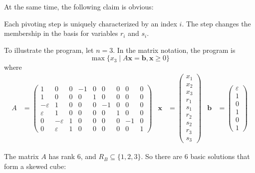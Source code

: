 \noindent
At the same time, the following claim is obvious:
\begin{clm}
  \label{clm:simplex:exp:1}
  Each pivoting step is uniquely characterized by an index $i$. The step changes the 
  membership in the basis for variables  $r_i$ and $s_i$.
\end{clm}

\noindent
To illustrate the program, let $n=3$. In the matrix notation, the program is 
$$\max\{x_3\mid A\bm{x}=\bm{b}, \bm{x}\ge 0\}$$
where
\begin{align*}
  A&=\left(\begin{array}{ccccccccc}
  1&0&0&-1&0&0&0&0&0\\
  1&0&0&0&1&0&0&0&0\\
  -\varepsilon&1&0&0&0&-1&0&0&0\\
  \varepsilon&1&0&0&0&0&1&0&0\\
  0&-\varepsilon&1&0&0&0&0&-1&0\\
0&\varepsilon&1&0&0&0&0&0&1\end{array}\right) &
\bm{x}&=\left(\begin{array}{l}x_1\\x_2\\x_3\\r_1\\s_1\\r_2\\s_2\\r_3\\s_3\end{array}\right) &
\bm{b}&=\left(\begin{array}{l}\varepsilon\\1\\0\\1\\0\\1\end{array}\right)
\end{align*}

\noindent
The matrix $A$ has rank $6$, and $R_B\subseteq\{1,2,3\}$. So there are $6$ basic solutions
that form a skewed cube:


